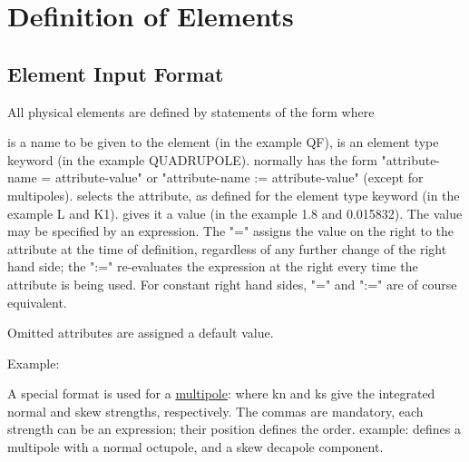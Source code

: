 
\chapter{Definition of Elements}

%
\section{Element Input Format}
\label{sec:element_input}

All physical elements are defined by statements of the form 
where 
\begin{madlist}
   is a name to be given to the element
  (in the example QF),  
   is an element type keyword (in
  the example QUADRUPOLE).  
   normally has the form
    "attribute-name = attribute-value" or
    "attribute-name := attribute-value" (except for multipoles).  
   selects the attribute,
    as defined for the element type keyword (in the example L and
    K1).  
   gives it a value
    (in the example 1.8 and 0.015832). The value may be specified
    by an expression. The "=" assigns the value on the right to
    the attribute at the time of definition, regardless of any
    further change of the right hand side; the ":=" re-evaluates
    the expression at the right every time the attribute is being
    used. For constant right hand sides, "=" and ":=" are of
    course equivalent.  
\end{madlist}

Omitted attributes are assigned a default value.

Example: 

A special format is used for a \href{multipole.html}{multipole}: 
where kn and ks give the integrated normal and skew strengths,
respectively. The commas are mandatory, each strength can be an
expression; their position defines the order. example:  
defines a multipole with a normal octupole, and a skew decapole component. 

